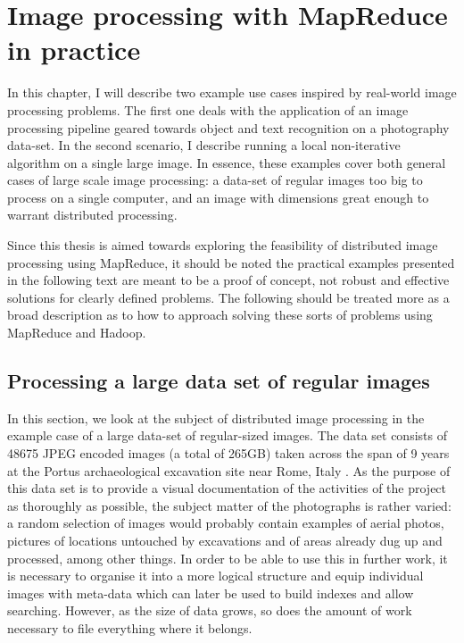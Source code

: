 \documentclass [12pt,a4paper]{report}
\begin{document}
\chapter{Image processing with MapReduce in practice}

In this chapter, I will describe two example use cases inspired by real-world image processing problems. The first one deals with the application of an image processing pipeline geared towards object and text recognition on a photography data-set. In the second scenario, I describe running a local non-iterative algorithm on a single large image. In essence, these examples cover both general cases of large scale image processing: a data-set of regular images too big to process on a single computer, and an image with dimensions great enough to warrant distributed processing.

Since this thesis is aimed towards exploring the feasibility of distributed image processing using MapReduce, it should be noted the practical examples presented in the following text are meant to be a proof of concept, not robust and effective solutions for clearly defined problems. The following should be treated more as a broad description as to how to approach solving these sorts of problems using MapReduce and Hadoop.

\section{Processing a large data set of regular images}

In this section, we look at the subject of distributed image processing in the example case of a large data-set of regular-sized images. The data set consists of 48675 JPEG encoded images (a total of 265GB) taken across the span of 9 years at the Portus archaeological excavation site near Rome, Italy \cite{portusproject}. As the purpose of this data set is to provide a visual documentation of the activities of the project as thoroughly as possible, the subject matter of the photographs is rather varied: a random selection of images would probably contain examples of aerial photos, pictures of locations untouched by excavations and of areas already dug up and processed, among other things. In order to be able to use this in further work, it is necessary to organise it into a more logical structure and equip individual images with meta-data which can later be used to build indexes and allow searching. However, as the size of data grows, so does the amount of work necessary to file everything where it belongs.
\end{document}
